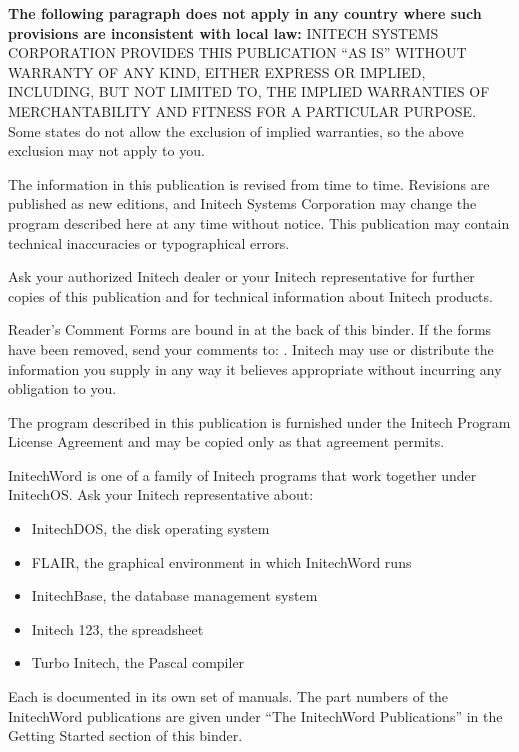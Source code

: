 \begin{TitleVerso}
{\imLegalFont
\textbf{The following paragraph does not apply in any country where such
provisions are inconsistent with local law:} INITECH SYSTEMS CORPORATION
PROVIDES THIS PUBLICATION ``AS IS'' WITHOUT WARRANTY OF ANY KIND, EITHER
EXPRESS OR IMPLIED, INCLUDING, BUT NOT LIMITED TO, THE IMPLIED WARRANTIES OF
MERCHANTABILITY AND FITNESS FOR A PARTICULAR PURPOSE.  Some states do not
allow the exclusion of implied warranties, so the above exclusion may not
apply to you.\par
The information in this publication is revised from time to time.
Revisions are published as new editions, and Initech Systems Corporation
may change the program described here at any time without notice.  This
publication may contain technical inaccuracies or typographical errors.\par
Ask your authorized Initech dealer or your Initech representative for
further copies of this publication and for technical information about
Initech products.\par}

{\footnotesize
Reader's Comment Forms are bound in at the back of this binder.  If the forms
have been removed, send your comments to: \InitechAddressLine.
Initech may use or distribute the information you supply in any way it
believes appropriate without incurring any obligation to you.\par
The program described in this publication is furnished under the Initech
Program License Agreement and may be copied only as that agreement
permits.\par}
\end{TitleVerso}

InitechWord is one of a family of Initech programs that work together
under InitechOS.  Ask your Initech representative about:
\begin{itemize}
\item InitechDOS, the disk operating system
\item FLAIR, the graphical environment in which InitechWord runs
\item InitechBase, the database management system
\item Initech 123, the spreadsheet
\item Turbo Initech, the Pascal compiler
\end{itemize}
Each is documented in its own set of manuals.  The part numbers of the
InitechWord publications are given under ``The InitechWord Publications''
in the Getting Started section of this binder.
